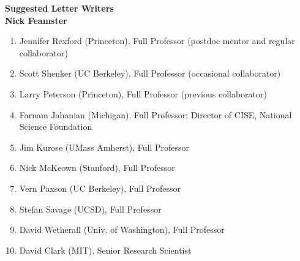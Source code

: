 \newpage \setcounter{page}{1}

\begin{center}
{\Large\textbf{Suggested Letter Writers}}\\[0.1in] {\large\textbf{Nick
Feamster}}\\
\end{center}

\begin{enumerate}
\itemsep=-2pt
\item Jennifer Rexford (Princeton), Full Professor (postdoc mentor and regular
collaborator) \\
\item Scott Shenker (UC Berkeley), Full Professor (occasional collaborator) \\
\item Larry Peterson (Princeton), Full Professor (previous collaborator) \\
\item Farnam Jahanian (Michigan), Full Professor; Director of CISE,
National Science Foundation \\
\item Jim Kurose (UMass Amherst), Full Professor \\
\item Nick McKeown (Stanford), Full Professor \\
\item Vern Paxson (UC Berkeley), Full Professor \\
\item Stefan Savage (UCSD), Full Professor \\
\item David Wetherall (Univ. of Washington), Full Professor \\
\item David Clark (MIT), Senior Research Scientist \\
\end{enumerate}
